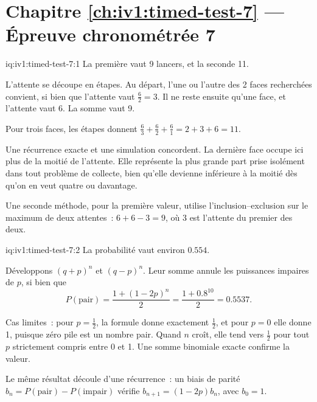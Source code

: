 \section*{Chapitre \ref{ch:iv1:timed-test-7} --- Épreuve chronométrée 7}

\begin{solution}{iq:iv1:timed-test-7:1}
La première vaut 9 lancers, et la seconde 11.

L'attente se découpe en étapes. Au départ, l'une ou l'autre des 2 faces recherchées convient, si bien que l'attente vaut $\frac62 = 3$. Il ne reste ensuite qu'une face, et l'attente vaut 6. La somme vaut 9.

Pour trois faces, les étapes donnent $\frac63 + \frac62 + \frac61 = 2 + 3 + 6 = 11$.

Une récurrence exacte et une simulation concordent. La dernière face occupe ici plus de la moitié de l'attente. Elle représente la plus grande part prise isolément dans tout problème de collecte, bien qu'elle devienne inférieure à la moitié dès qu'on en veut quatre ou davantage.

Une seconde méthode, pour la première valeur, utilise l'inclusion--exclusion sur le maximum de deux attentes~: $6 + 6 - 3 = 9$, où 3 est l'attente du premier des deux.

\end{solution}

\begin{solution}{iq:iv1:timed-test-7:2}
La probabilité vaut environ $0.554$.

Développons $(q + p)^n$ et $(q - p)^n$. Leur somme annule les puissances impaires de $p$, si bien que
\[
P(\text{pair}) = \frac{1 + (1 - 2p)^n}{2} = \frac{1 + 0.8^{10}}{2} = 0.5537.
\]

Cas limites~: pour $p = \frac12$, la formule donne exactement $\frac12$, et pour $p = 0$ elle donne 1, puisque zéro pile est un nombre pair. Quand $n$ croît, elle tend vers $\frac12$ pour tout $p$ strictement compris entre 0 et 1. Une somme binomiale exacte confirme la valeur.

Le même résultat découle d'une récurrence~: un biais de parité $b_n = P(\text{pair}) - P(\text{impair})$ vérifie $b_{n + 1} = (1 - 2p)b_n$, avec $b_0 = 1$.

\end{solution}

